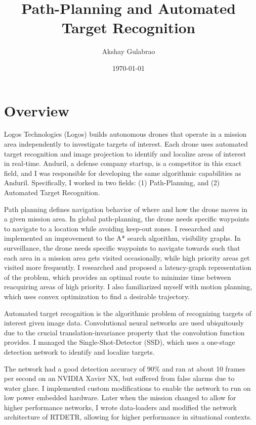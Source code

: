\documentclass[12pt]{article}
\title{Path-Planning and Automated Target Recognition}
\author{Akshay Gulabrao}
\date{\today}
\begin{document}
\maketitle
\section{Overview}
Logos Technologies (Logos) builds autonomous drones that operate in a mission area independently to investigate targets of interest. Each drone uses automated target recognition and image projection to identify and localize areas of interest in real-time. Anduril, a defense company startup,  is a competitor in this exact field, and I was responsible for developing the same algorithmic capabilities as Anduril. Specifically, I worked in two fields: (1) Path-Planning, and (2) Automated Target Recognition.

Path planning defines navigation behavior of where and how the drone moves in a given mission area.
In global path-planning, the drone needs specific waypoints to navigate to a location while avoiding keep-out zones.
I researched and implemented an improvement to the A* search algorithm, visibility graphs.
In surveillance, the drone needs specific waypoints to navigate towards such that each area in a mission area gets visited occasionally, while high priority areas get visited more frequently.
I researched and proposed a latency-graph representation of the problem, which provides an optimal route to minimize time between reacquiring areas of high priority.
I also familiarized myself with motion planning, which uses convex optimization to find a desirable trajectory.

Automated target recognition is the algorithmic problem of recognizing targets of interest given image data.
Convolutional neural networks are used ubiquitously due to the crucial translation-invariance property that the convolution function provides.
I managed the Single-Shot-Detector (SSD), which uses a one-stage detection network to identify and localize targets.

The network had a good detection accuracy of 90\% and ran at about 10 frames per second on an NVIDIA Xavier NX, but suffered from false alarms due to water glare.
I implemented custom modifications to enable the network to run on low power embedded hardware.
Later when the mission changed to allow for higher performance networks, I wrote data-loaders and modified the network architecture of RTDETR, allowing for higher performance in situational contexts.
\end{document}
